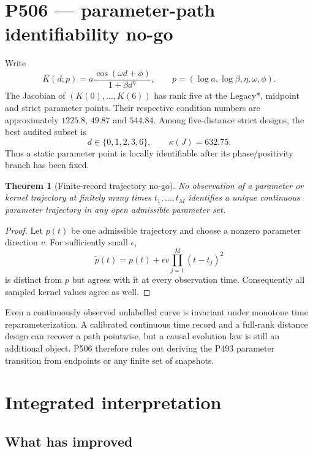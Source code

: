 \documentclass[11pt,a4paper]{article}
\newtheorem{theorem}{Theorem}[section]
\theoremstyle{definition}
\theoremstyle{remark}
\begin{document}
\section{P506 --- parameter-path identifiability no-go}

Write
\[
 K(d;p)=a\frac{\cos(\omega d+\phi)}{1+\beta d^\eta},
 \qquad p=(\log a,\log\beta,\eta,\omega,\phi).
\]
The Jacobian of $(K(0),\ldots,K(6))$ has rank five at the Legacy*, midpoint and strict parameter points. Their respective condition numbers are approximately $1225.8$, $49.87$ and $544.84$. Among five-distance strict designs, the best audited subset is
\[
 d\in\{0,1,2,3,6\},\qquad \kappa(J)=632.75.
\]
Thus a static parameter point is locally identifiable after its phase/positivity branch has been fixed.

\begin{theorem}[Finite-record trajectory no-go]
No observation of a parameter or kernel trajectory at finitely many times $t_1,\ldots,t_M$ identifies a unique continuous parameter trajectory in any open admissible parameter set.
\end{theorem}
\begin{proof}
Let $p(t)$ be one admissible trajectory and choose a nonzero parameter direction $v$. For sufficiently small $\epsilon$,
\[
 \widetilde p(t)=p(t)+\epsilon v\prod_{j=1}^M(t-t_j)^2
\]
is distinct from $p$ but agrees with it at every observation time. Consequently all sampled kernel values agree as well.
\end{proof}

Even a continuously observed unlabelled curve is invariant under monotone time reparameterization. A calibrated continuous time record and a full-rank distance design can recover a path pointwise, but a causal evolution law is still an additional object. P506 therefore rules out deriving the P493 parameter transition from endpoints or any finite set of snapshots.

\section{Integrated interpretation}

\subsection{What has improved}
\end{document}

